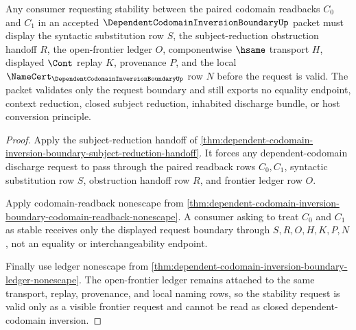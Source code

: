 \begin{theorem}
\label{thm:dependent-codomain-inversion-boundary-readback-stability-request}
Any consumer requesting stability between the paired codomain readbacks $C_0$ and $C_1$ in an accepted $\DependentCodomainInversionBoundaryUp$ packet must display the syntactic substitution row $S$, the subject-reduction obstruction handoff $R$, the open-frontier ledger $O$, componentwise $\hsame$ transport $H$, displayed $\Cont$ replay $K$, provenance $P$, and the local $\NameCert_{\DependentCodomainInversionBoundaryUp}$ row $N$ before the request is valid. The packet validates only the request boundary and still exports no equality endpoint, context reduction, closed subject reduction, inhabited discharge bundle, or host conversion principle.
\end{theorem}
\begin{proof}
Apply the subject-reduction handoff of \autoref{thm:dependent-codomain-inversion-boundary-subject-reduction-handoff}. It forces any dependent-codomain discharge request to pass through the paired readback rows $C_0,C_1$, syntactic substitution row $S$, obstruction handoff row $R$, and frontier ledger row $O$.

Apply codomain-readback nonescape from \autoref{thm:dependent-codomain-inversion-boundary-codomain-readback-nonescape}. A consumer asking to treat $C_0$ and $C_1$ as stable receives only the displayed request boundary through $S,R,O,H,K,P,N$, not an equality or interchangeability endpoint.

Finally use ledger nonescape from \autoref{thm:dependent-codomain-inversion-boundary-ledger-nonescape}. The open-frontier ledger remains attached to the same transport, replay, provenance, and local naming rows, so the stability request is valid only as a visible frontier request and cannot be read as closed dependent-codomain inversion.
\end{proof}


